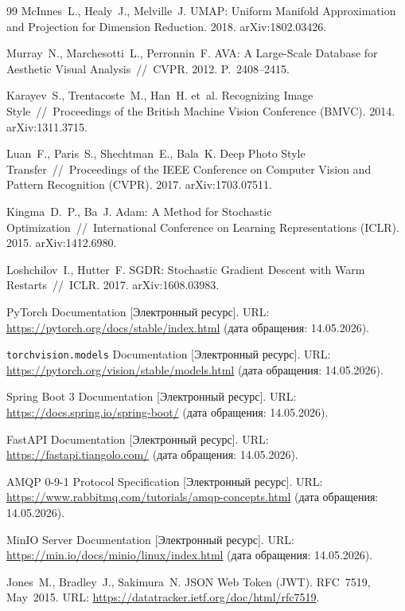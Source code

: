 \documentclass[a4paper,12pt]{diplom}
\begin{document}
\begin{thebibliography}{99}
McInnes~L., Healy~J., Melville~J. UMAP: Uniform Manifold Approximation and Projection for Dimension Reduction. 2018. arXiv:1802.03426.

Murray~N., Marchesotti~L., Perronnin~F. AVA: A Large-Scale Database for Aesthetic Visual Analysis~//~CVPR. 2012. P.~2408--2415.

Karayev~S., Trentacoste~M., Han~H. et~al. Recognizing Image Style~//~Proceedings of the British Machine Vision Conference (BMVC). 2014. arXiv:1311.3715.

Luan~F., Paris~S., Shechtman~E., Bala~K. Deep Photo Style Transfer~//~Proceedings of the IEEE Conference on Computer Vision and Pattern Recognition (CVPR). 2017. arXiv:1703.07511.

Kingma~D.~P., Ba~J. Adam: A Method for Stochastic Optimization~//~International Conference on Learning Representations (ICLR). 2015. arXiv:1412.6980.

Loshchilov~I., Hutter~F. SGDR: Stochastic Gradient Descent with Warm Restarts~//~ICLR. 2017. arXiv:1608.03983.

PyTorch Documentation [Электронный ресурс]. URL: \url{https://pytorch.org/docs/stable/index.html} (дата обращения: 14.05.2026).

\texttt{torchvision.models} Documentation [Электронный ресурс].
URL: \url{https://pytorch.org/vision/stable/models.html} (дата обращения: 14.05.2026).

Spring Boot 3 Documentation [Электронный ресурс]. URL: \url{https://docs.spring.io/spring-boot/} (дата обращения: 14.05.2026).

FastAPI Documentation [Электронный ресурс]. URL: \url{https://fastapi.tiangolo.com/} (дата обращения: 14.05.2026).

AMQP 0-9-1 Protocol Specification [Электронный ресурс].
URL: \url{https://www.rabbitmq.com/tutorials/amqp-concepts.html} (дата обращения: 14.05.2026).

MinIO Server Documentation [Электронный ресурс]. URL: \url{https://min.io/docs/minio/linux/index.html} (дата обращения: 14.05.2026).

Jones~M., Bradley~J., Sakimura~N. JSON Web Token (JWT). RFC~7519, May~2015. URL: \url{https://datatracker.ietf.org/doc/html/rfc7519}.


\end{thebibliography}
\end{document}
